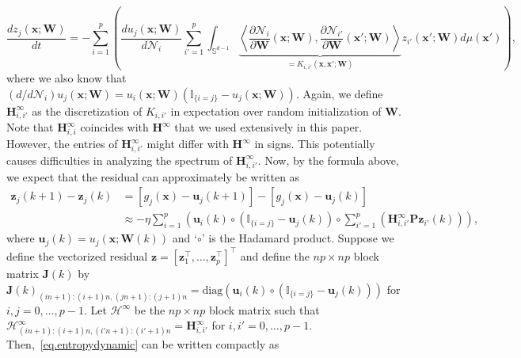 {\begin{equation*}
    \frac{dz_j(\mathbf{x}; \mathbf{W})}{dt} = -\sum_{i=1}^p \left( \frac{du_j(\mathbf{x}; \mathbf{W})}{d\mathcal{N}_i} \sum_{i'=1}^p \int_{\mathbb{S}^{d-1}} \underbrace{\left\langle \frac{\partial \mathcal{N}_i}{\partial \mathbf{W}} (\mathbf{x}; \mathbf{W}), \frac{\partial \mathcal{N}_{i'}}{\partial \mathbf{W}}(\mathbf{x}'; \mathbf{W}) \right\rangle}_{= K_{i,i'}(\mathbf{x},\mathbf{x}';\mathbf{W})} z_{i'}(\mathbf{x}'; \mathbf{W}) d\mu(\mathbf{x}')\right),
\end{equation*}
where we also know that $(d/d\mathcal{N}_i)u_j(\mathbf{x}; \mathbf{W}) = u_i(\mathbf{x}; \mathbf{W})(\mathbb{I}_{\{i=j\}}-u_j(\mathbf{x}; \mathbf{W}))$. Again, we define $\mathbf{H}_{i,i'}^\infty$ as the discretization of $K_{i,i'}$ in expectation over random initialization of $\mathbf{W}$. Note that $\mathbf{H}^\infty_{i,i}$ coincides with $\mathbf{H}^\infty$ that we used extensively in this paper. However, the entries of $\mathbf{H}^\infty_{i,i'}$ might differ with $\mathbf{H}^\infty$ in signs. This potentially causes difficulties in analyzing the spectrum of $\mathbf{H}^\infty_{i,i'}$. Now, by the formula above, we expect that the residual can approximately be written as
\begin{equation}\label{eq.entropydynamic}
\begin{aligned}
    \mathbf{z}_j(k+1) - \mathbf{z}_j(k) &= [g_j(\mathbf{x}) - \mathbf{u}_j(k+1)] - [g_j(\mathbf{x}) - \mathbf{u}_j(k)] \\
    &\approx -\eta \sum_{i=1}^p \left(\mathbf{u}_i(k) \circ (\mathbb{I}_{\{i=j\}}-\mathbf{u}_j(k)) \circ \sum_{i'=1}^p \left(\mathbf{H}_{i,i'}^\infty \mathbf{P}\mathbf{z}_{i'}(k)\right)\right),
\end{aligned}
\end{equation}
where $\mathbf{u}_j(k) = u_j(\mathbf{x};\mathbf{W}(k))$ and `$\circ$' is the Hadamard product. Suppose we define the vectorized residual $\mathbf{z} = \left[\mathbf{z}_1^\top, \ldots, \mathbf{z}_p^\top\right]^\top$ and define the $np \times np$ block matrix $\mathbf{J}(k)$ by $\mathbf{J}(k)_{(in+1):(i+1)n, (jn+1):(j+1)n} = \text{diag}\left(\mathbf{u}_i(k) \circ (\mathbb{I}_{\{i=j\}}-\mathbf{u}_j(k))\right)$ for $i,j = 0, \ldots, p-1$. Let $\boldsymbol{\mathcal{H}}^\infty$ be the $np \times np$ block matrix such that $\boldsymbol{\mathcal{H}}^\infty_{(in+1):(i+1)n, (i'n+1):(i'+1)n} = \mathbf{H}_{i,i'}^\infty$ for $i, i' = 0, \ldots, p-1$. Then,~\cref{eq.entropydynamic} can be written compactly as
}
